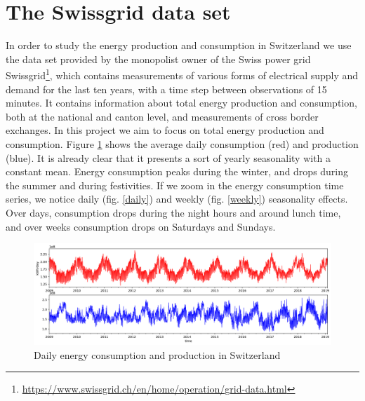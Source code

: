\documentclass[12pt]{report}
\begin{document}
{\section{The Swissgrid data set}

In order to study the energy production and consumption in Switzerland we use the data set provided by the monopolist owner of the Swiss power grid Swissgrid\footnote{\url{https://www.swissgrid.ch/en/home/operation/grid-data.html}}, which contains measurements of various forms of electrical supply and demand for the last ten years, with a time step between observations of 15 minutes.
It contains information about total energy production and consumption, both at the national and canton level, and measurements of cross border exchanges.
In this project we aim to focus on total energy production and consumption. Figure \ref{full dataset} shows the average daily consumption (red) and production (blue). It is already clear that it presents a sort of yearly seasonality with a constant mean. Energy consumption peaks during the winter, and drops during the summer and during festivities. If we zoom in the energy consumption time series, we notice daily (fig. \ref{daily}) and weekly (fig. \ref{weekly}) seasonality effects. Over days, consumption drops during the night hours and around lunch time, and over weeks consumption drops on Saturdays and Sundays.
\begin{figure}
    \centering
    \includegraphics[width=\textwidth]{total_info.png}
    \caption{Daily energy consumption and production in Switzerland}
    \label{full dataset}
\end{figure}

}
\end{document}
